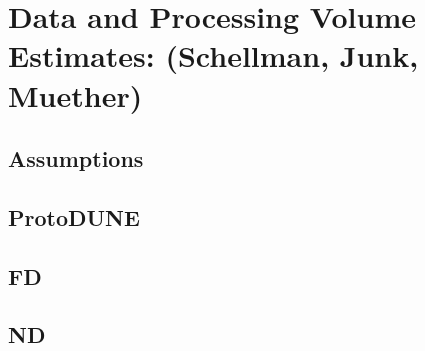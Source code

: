 \chapter{Data and Processing Volume Estimates: (Schellman, Junk, Muether)}
\label{ch:est}

\section{Assumptions}
\label{sec:est:assume}  %

\section{ProtoDUNE}
\label{sec:est:FD}  

\section{FD}
\label{sec:est:FD}  

\section{ND}
\label{sec:est:ND}  